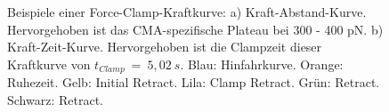 \begin{figure}[H]
	\centering
	\begin{subfigure}[b]{\textwidth}
		\centering
		\subcaption{}
		\label{subfig:kraft_abstand}		
	\end{subfigure}
	\begin{subfigure}[b]{\textwidth}
		\centering
		\subcaption{}
		\label{subfig:kraft_zeit}			
	\end{subfigure}
	\caption[Beispiele einer Force-Clamp-Kraftkurve]{Beispiele einer Force-Clamp-Kraftkurve: a) Kraft-Abstand-Kurve. Hervorgehoben ist das \acs*{CMA}-spezifische Plateau bei 300 - 400 pN. b) Kraft-Zeit-Kurve. Hervorgehoben ist die Clampzeit dieser Kraftkurve von $t_{Clamp}~=~5,02~s$. Blau: Hinfahrkurve. Orange: Ruhezeit. Gelb: Initial Retract. Lila: Clamp Retract. Grün: Retract. Schwarz: Retract.}
	\label{fig:force_clamp_kurve}
\end{figure}

